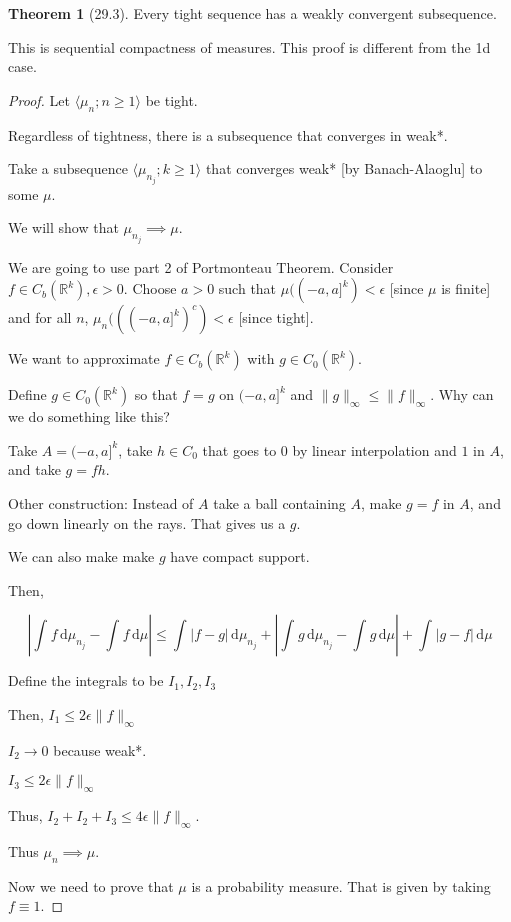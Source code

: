 \documentclass{article}
\theoremstyle{definition}
\newtheorem{theorem}{Theorem}
\begin{document}
\begin{theorem}
    [29.3] Every tight sequence has a weakly convergent subsequence.
\end{theorem}

This is sequential compactness of measures. This proof is different from the 1d case.

\begin{proof}
    Let \(\langle \mu_n ; n \geq 1 \rangle \) be tight.

    Regardless of tightness, there is a subsequence that converges in weak*.

    Take a subsequence \(\langle \mu_{n_j}; k \geq 1 \rangle \) that converges weak* [by Banach-Alaoglu] to some \(\mu\).

    We will show that \(\mu_{n_j} \implies \mu\).

    We are going to use part 2 of Portmonteau Theorem. Consider \(f\in C_b(\mathbb{R}^k), \epsilon > 0\). Choose \(a > 0\) such that \(\mu((-a,a]^k) < \epsilon\) [since \(\mu\) is finite] and for all \(n\), \(\mu_n(((-a,a]^k)^c)< \epsilon\) [since tight].

    We want to approximate \(f\in C_b(\mathbb{R}^k)\) with \(g\in C_0(\mathbb{R}^k)\).

    Define \(g\in C_0(\mathbb{R}^k)\) so that \(f = g\) on \((-a,a]^k\) and \(\lVert g \rVert _\infty \leq \lVert f \rVert _\infty\). Why can we do something like this?

    Take \(A = (-a,a]^k\), take \(h\in C_0\) that goes to \(0\) by linear interpolation and \(1\) in \(A\), and take \(g = fh\).

    Other construction: Instead of \(A\) take a ball containing \(A\), make \(g = f\) in \(A\), and go down linearly on the rays. That gives us a \(g\).

    We can also make make \(g\) have compact support.

    Then,

    \[
        \left\vert \int_{}^{} f \,\mathrm{d}\mu_{n_j} - \int_{}^{} f \,\mathrm{d}\mu  \right\vert \leq \int_{}^{} \vert f - g \vert  \,\mathrm{d}\mu_{n_j} + \left\vert \int_{}^{} g \,\mathrm{d}\mu_{n_j} - \int_{}^{} g \,\mathrm{d}\mu  \right\vert + \int_{}^{} \vert g - f \vert \,\mathrm{d}\mu
    \]

    Define the integrals to be \(I_1, I_2, I_3\) 
    
    Then, \(I_1 \leq 2 \epsilon \lVert f \rVert _\infty  \) 

    \(I_2 \to 0\) because weak*.

    \(I_3 \leq 2 \epsilon \lVert f \rVert _\infty \) 

    Thus, \(I_2 + I_2 + I_3 \leq 4 \epsilon \lVert f \rVert _ \infty\).

    Thus \(\mu_n \implies \mu\).

    Now we need to prove that \(\mu\) is a probability measure. That is given by taking \(f \equiv 1\).

\end{proof}
\end{document}
